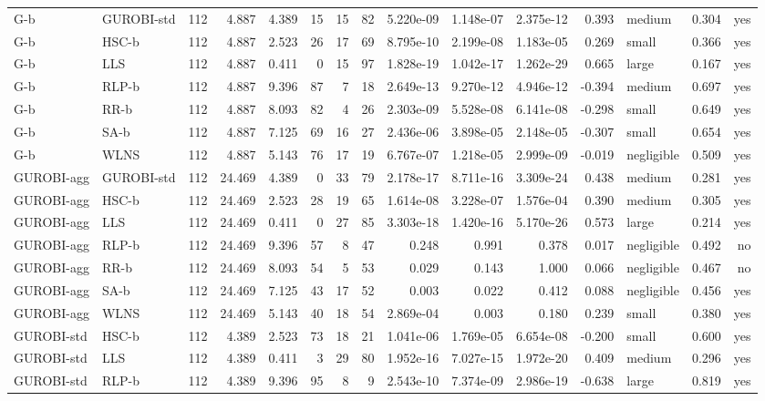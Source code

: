 \begin{table}[htbp]
\begin{tabular}{llrrrrrrrrrrlrr}
G-b & GUROBI-std & 112 & 4.887 & 4.389 & 15 & 15 & 82 & 5.220e-09 & 1.148e-07 & 2.375e-12 & 0.393 & medium & 0.304 & yes \\
G-b & HSC-b & 112 & 4.887 & 2.523 & 26 & 17 & 69 & 8.795e-10 & 2.199e-08 & 1.183e-05 & 0.269 & small & 0.366 & yes \\
G-b & LLS & 112 & 4.887 & 0.411 & 0 & 15 & 97 & 1.828e-19 & 1.042e-17 & 1.262e-29 & 0.665 & large & 0.167 & yes \\
G-b & RLP-b & 112 & 4.887 & 9.396 & 87 & 7 & 18 & 2.649e-13 & 9.270e-12 & 4.946e-12 & -0.394 & medium & 0.697 & yes \\
G-b & RR-b & 112 & 4.887 & 8.093 & 82 & 4 & 26 & 2.303e-09 & 5.528e-08 & 6.141e-08 & -0.298 & small & 0.649 & yes \\
G-b & SA-b & 112 & 4.887 & 7.125 & 69 & 16 & 27 & 2.436e-06 & 3.898e-05 & 2.148e-05 & -0.307 & small & 0.654 & yes \\
G-b & WLNS & 112 & 4.887 & 5.143 & 76 & 17 & 19 & 6.767e-07 & 1.218e-05 & 2.999e-09 & -0.019 & negligible & 0.509 & yes \\
GUROBI-agg & GUROBI-std & 112 & 24.469 & 4.389 & 0 & 33 & 79 & 2.178e-17 & 8.711e-16 & 3.309e-24 & 0.438 & medium & 0.281 & yes \\
GUROBI-agg & HSC-b & 112 & 24.469 & 2.523 & 28 & 19 & 65 & 1.614e-08 & 3.228e-07 & 1.576e-04 & 0.390 & medium & 0.305 & yes \\
GUROBI-agg & LLS & 112 & 24.469 & 0.411 & 0 & 27 & 85 & 3.303e-18 & 1.420e-16 & 5.170e-26 & 0.573 & large & 0.214 & yes \\
GUROBI-agg & RLP-b & 112 & 24.469 & 9.396 & 57 & 8 & 47 & 0.248 & 0.991 & 0.378 & 0.017 & negligible & 0.492 & no \\
GUROBI-agg & RR-b & 112 & 24.469 & 8.093 & 54 & 5 & 53 & 0.029 & 0.143 & 1.000 & 0.066 & negligible & 0.467 & no \\
GUROBI-agg & SA-b & 112 & 24.469 & 7.125 & 43 & 17 & 52 & 0.003 & 0.022 & 0.412 & 0.088 & negligible & 0.456 & yes \\
GUROBI-agg & WLNS & 112 & 24.469 & 5.143 & 40 & 18 & 54 & 2.869e-04 & 0.003 & 0.180 & 0.239 & small & 0.380 & yes \\
GUROBI-std & HSC-b & 112 & 4.389 & 2.523 & 73 & 18 & 21 & 1.041e-06 & 1.769e-05 & 6.654e-08 & -0.200 & small & 0.600 & yes \\
GUROBI-std & LLS & 112 & 4.389 & 0.411 & 3 & 29 & 80 & 1.952e-16 & 7.027e-15 & 1.972e-20 & 0.409 & medium & 0.296 & yes \\
GUROBI-std & RLP-b & 112 & 4.389 & 9.396 & 95 & 8 & 9 & 2.543e-10 & 7.374e-09 & 2.986e-19 & -0.638 & large & 0.819 & yes \\

\end{tabular}
\end{table}
